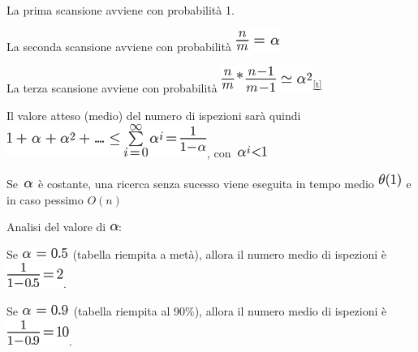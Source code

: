\documentclass{article}
\begin{document}
{La prima scansione avviene con probabilità 1.}

{La seconda scansione avviene con probabilità
}\includegraphics{images/image323.png}

{La terza scansione avviene con probabilità
}\includegraphics{images/image324.png}\textsuperscript{\protect\hyperlink{cmnt20}{{[}t{]}}}

{Il valore atteso (medio) del numero di ispezioni sarà quindi
}\includegraphics{images/image325.png}{,
con}{~}\includegraphics{images/image326.png}

{}

{Se}{~}\includegraphics{images/image327.png}{~è costante, una ricerca
senza sucesso viene eseguita in tempo medio
}\includegraphics{images/image328.png}{~e in caso pessimo
}$O(n)$

{}

{Analisi del valore di }\includegraphics{images/image327.png}{:}

{Se }\includegraphics{images/image329.png}{~(tabella riempita a metà),
allora il numero medio di ispezioni è
}\includegraphics{images/image330.png}{.}

{Se }\includegraphics{images/image331.png}{~(tabella riempita al 90\%),
allora il numero medio di ispezioni è
}\includegraphics{images/image332.png}{.}
\end{document}
